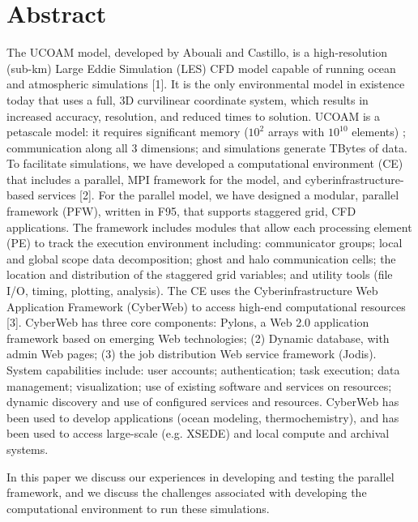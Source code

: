 \documentclass[article, A4, 11pt]{llncs}%
\begin{document}
\section*{Abstract}
The UCOAM model, developed by Abouali and Castillo, is a high-resolution (sub-km) Large Eddie Simulation (LES) CFD model capable of running  ocean and atmospheric simulations [1]. It is the only environmental model in existence today that uses a full, 3D curvilinear coordinate system, which results in increased accuracy, resolution, and reduced times to solution. UCOAM is a petascale model: it requires significant memory ($10^{2}$ arrays with $10^{10}$ elements) ; communication  along all 3 dimensions; and simulations generate TBytes of data. To facilitate simulations, we have developed a computational environment (CE) that includes a parallel, MPI framework for the model, and cyberinfrastructure-based services [2]. For the parallel model, we have designed a modular, parallel framework (PFW), written in F95, that supports staggered grid, CFD applications. The framework includes modules that allow each processing element (PE) to track the execution environment including: communicator groups; local and global scope data decomposition; ghost and halo communication cells; the location and distribution of the staggered grid variables; and utility tools (file I/O, timing, plotting, analysis). The CE uses the Cyberinfrastructure Web Application Framework (CyberWeb) to access high-end computational resources [3]. CyberWeb has three core components: Pylons, a Web 2.0  application framework based on emerging Web technologies; (2) Dynamic database, with admin Web pages; (3) the job distribution Web service framework (Jodis). System capabilities include: user accounts; authentication; task execution; data management; visualization; use of existing software and services on resources; dynamic discovery and use of configured services and resources. CyberWeb has been used to develop applications (ocean modeling, thermochemistry), and has been used to access large-scale (e.g. XSEDE) and local compute and archival systems. 

In this paper we discuss our experiences in developing and testing the parallel framework, and we discuss the challenges associated with developing the computational environment to run these simulations.
\end{document}
